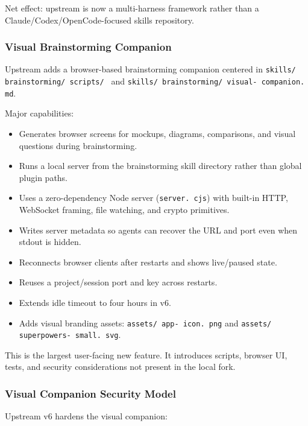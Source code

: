 \documentclass[twocolumn,10pt,letterpaper]{article}
\begin{document}
Net effect: upstream is now a multi-harness framework rather than a Claude/Codex/OpenCode-focused skills repository.


\subsubsection{Visual Brainstorming Companion}

Upstream adds a browser-based brainstorming companion centered in \texttt{skills/ brainstorming/ scripts/ } and \texttt{skills/ brainstorming/ visual- companion. md}.


Major capabilities:


\begin{itemize}
\setlength{\itemsep}{0pt}
\setlength{\parskip}{0pt}
  \item Generates browser screens for mockups, diagrams, comparisons, and visual questions during brainstorming.
  \item Runs a local server from the brainstorming skill directory rather than global plugin paths.
  \item Uses a zero-dependency Node server (\texttt{server. cjs}) with built-in HTTP, WebSocket framing, file watching, and crypto primitives.
  \item Writes server metadata so agents can recover the URL and port even when stdout is hidden.
  \item Reconnects browser clients after restarts and shows live/paused state.
  \item Reuses a project/session port and key across restarts.
  \item Extends idle timeout to four hours in v6.
  \item Adds visual branding assets: \texttt{assets/ app- icon. png} and \texttt{assets/ superpowers- small. svg}.
\end{itemize}

This is the largest user-facing new feature. It introduces scripts, browser UI, tests, and security considerations not present in the local fork.


\subsubsection{Visual Companion Security Model}

Upstream v6 hardens the visual companion:
\end{document}
